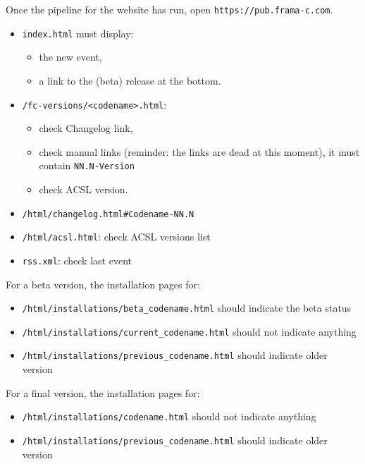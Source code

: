 Once the pipeline for the website has run, open \texttt{https://pub.frama-c.com}.

\begin{itemize}
  \item \texttt{index.html} must display:
  \begin{itemize}
    \item the new event,
    \item a link to the (beta) release at the bottom.
  \end{itemize}
  \item \texttt{/fc-versions/<codename>.html}:
  \begin{itemize}
    \item check Changelog link,
    \item check manual links (reminder: the links are dead at this moment), it must contain \texttt{NN.N-Version}
    \item check ACSL version.
  \end{itemize}
  \item \texttt{/html/changelog.html\#Codename-NN.N}
  \item \texttt{/html/acsl.html}: check ACSL versions list
  \item \texttt{rss.xml}: check last event
\end{itemize}

For a beta version, the installation pages for:
\begin{itemize}
\item \texttt{/html/installations/beta\_codename.html} should indicate the beta status
\item \texttt{/html/installations/current\_codename.html} should not indicate anything
\item \texttt{/html/installations/previous\_codename.html} should indicate older version
\end{itemize}

For a final version, the installation pages for:
\begin{itemize}
\item \texttt{/html/installations/codename.html} should not indicate anything
\item \texttt{/html/installations/previous\_codename.html} should indicate older version
\end{itemize}

